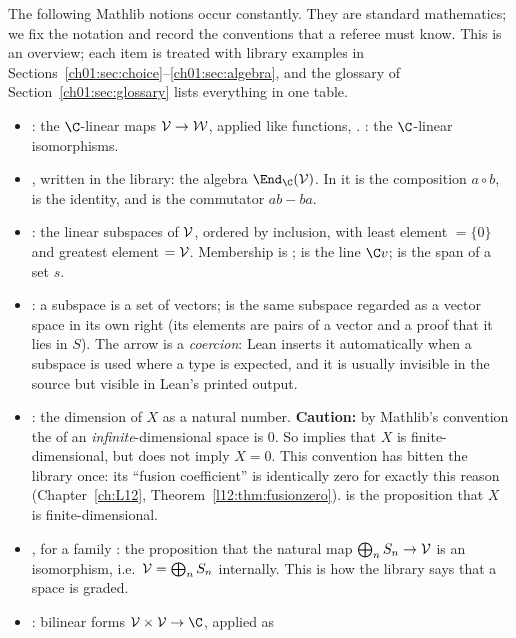 The following Mathlib notions occur constantly. They are standard mathematics; we fix the notation
and record the conventions that a referee must know. This is an overview; each item is treated with
library examples in Sections~\ref{ch01:sec:choice}--\ref{ch01:sec:algebra}, and the glossary of
Section~\ref{ch01:sec:glossary} lists everything in one table.
\begin{itemize}
\item {}: the $\C$-linear maps $\mathcal{V}\to\mathcal W$, applied like functions,
  . : the $\C$-linear isomorphisms.
\item {}, written  in the library: the algebra $\End_\C(\choneV)$.
  In it  is the composition $a\circ b$,  is the identity, and  is
  the commutator $ab-ba$.
\item {}: the linear subspaces of $\mathcal{V}$, ordered by inclusion, with least
  element  $=\{0\}$ and greatest element  $=\mathcal{V}$. Membership is ;
   is the line $\C v$;  is the span of a set $s$.
\item {}: a subspace  is a set of vectors;  is the same
  subspace regarded as a vector space in its own right (its elements are pairs of a vector and a
  proof that it lies in $S$). The arrow is a \emph{coercion}: Lean inserts it automatically when a
  subspace is used where a type is expected, and it is usually invisible in the source but visible
  in Lean's printed output.
\item {}: the dimension of $X$ as a natural number. \textbf{Caution:} by
  Mathlib's convention the  of an \emph{infinite}-dimensional space is $0$. So
   implies that $X$ is finite-dimensional, but 
  does not imply $X = 0$. This convention has bitten the library once: its ``fusion coefficient'' is
  identically zero for exactly this reason (Chapter~\ref{ch:L12}, Theorem~\ref{l12:thm:fusionzero}).
   is the proposition that $X$ is finite-dimensional.
\item {}, for a family : the proposition
  that the natural map $\bigoplus_n S_n\to\mathcal{V}$ is an isomorphism, i.e.\
  $\mathcal{V} = \bigoplus_n S_n$ internally. This is how the library says that a space is graded.
\item \lean{LinearMap.BilinForm ℂ 𝒱}: bilinear forms $\choneV\times\choneV\to\C$, applied as

\end{itemize}
